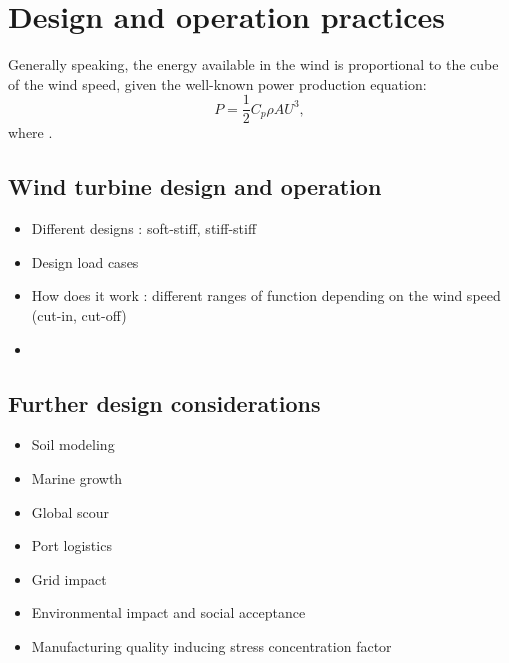 \section{Design and operation practices} \label{sec:owt_design}

Generally speaking, the energy available in the wind is proportional to the cube of the wind speed, given the well-known power production equation:
\begin{equation}
    P = \frac12 C_p \rho A U^3,
\end{equation}  
where .


\subsection{Wind turbine design and operation}
    \begin{itemize}
        \item Different designs : soft-stiff, stiff-stiff 
        \item Design load cases 
        \item How does it work : different ranges of function depending on the wind speed (cut-in, cut-off)
        \item 
    \end{itemize}

\subsection{Further design considerations}
\begin{itemize}
    \item Soil modeling
    \item Marine growth
    \item Global scour
    \item Port logistics
    \item Grid impact
    \item Environmental impact and social acceptance 
    \item Manufacturing quality inducing stress concentration factor
\end{itemize}



